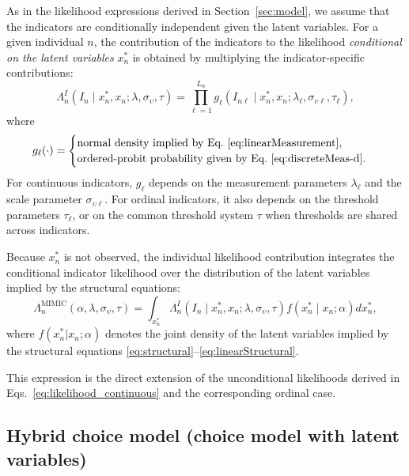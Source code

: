 \documentclass[12pt,a4paper]{article}
\begin{document}
As in the likelihood expressions derived in Section~\ref{sec:model},
we assume that the indicators are conditionally independent given the
latent variables. For a given individual $n$, the contribution of the
indicators to the likelihood \emph{conditional on the latent
variables} $x_n^*$ is obtained by multiplying the indicator-specific
contributions:
\begin{equation}
  \label{eq:mimic_conditional_indicator_likelihood}
  \Lambda_n^{I}(I_n\mid x_n^*,x_n;\lambda,\sigma_{\upsilon},\tau)
=
\prod_{\ell=1}^{L_n}
g_\ell(I_{n\ell}\mid x_n^*,x_n;\lambda_\ell,\sigma_{\upsilon\ell},\tau_\ell),
\end{equation}
where
\[
g_\ell(\cdot)
=
\begin{cases}
\text{normal density implied by
Eq.~\eqref{eq:linearMeasurement}},
\\
\text{ordered-probit probability given by
Eq.~\eqref{eq:discreteMeas-d}}.
\end{cases}
\]
For continuous indicators, \(g_\ell\) depends on the measurement
parameters \(\lambda_\ell\) and the scale parameter
\(\sigma_{\upsilon\ell}\). For ordinal indicators, it also depends on
the threshold parameters \(\tau_\ell\), or on the common threshold
system \(\tau\) when thresholds are shared across indicators.

Because $x_n^*$ is not observed, the individual likelihood
contribution integrates the conditional indicator likelihood over the
distribution of the latent variables implied by the structural
equations:
\begin{equation}
  \label{eq:mimic_likelihood}
  \Lambda_n^{\text{MIMIC}}(\alpha,\lambda,\sigma_{\upsilon},\tau)
=
\int_{x_n^*}
\Lambda_n^{I}(I_n\mid x_n^*,x_n;\lambda,\sigma_{\upsilon},\tau)
f(x_n^*\mid x_n;\alpha)
dx_n^*,
\end{equation}
where \(f(x_n^*|x_n;\alpha)\) denotes the joint density of the latent
variables implied by the structural equations
\eqref{eq:structural}--\eqref{eq:linearStructural}.

This expression is the direct extension of the unconditional
likelihoods derived in
Eqs.~\eqref{eq:likelihood_continuous} and the corresponding ordinal
case.

\subsection{Hybrid choice model (choice model with latent variables)}
\label{sec:hybrid_choice_model}
\end{document}
